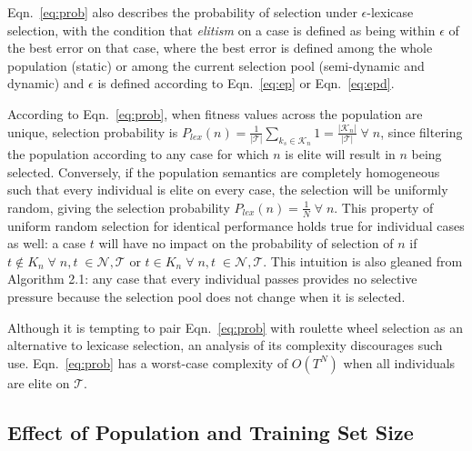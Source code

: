 \documentclass[twoside]{article}
\begin{document}
Eqn.~\ref{eq:prob} also describes the probability of selection under $\epsilon$-lexicase selection, with the condition that {\it elitism} on a case is defined as being within $\epsilon$ of the best error on that case, where the best error is defined among the whole population (static) or among the current selection pool (semi-dynamic and dynamic) and $\epsilon$ is defined according to Eqn.~\ref{eq:ep} or Eqn.~\ref{eq:epd}. 

According to Eqn.~\ref{eq:prob}, when fitness values across the population are unique, selection probability is $P_{lex}(n) = \frac{1}{|\mathcal{T}|} \sum_{k_s \in \mathcal{K}_n} 1 = \frac{|\mathcal{K}_n|}{|\mathcal{T}|} \; \forall \; n$, since filtering the population according to any case for which $n$ is elite will result in $n$ being selected. Conversely, if the population semantics are completely homogeneous such that every individual is elite on every case, the selection will be uniformly random, giving the selection probability $P_{lex}(n) = \frac{1}{N} \; \forall \; n$. This property of uniform random selection for identical performance holds true for individual cases as well: a case $t$ will have no impact on the probability of selection of $n$ if $t \notin K_n \; \forall \; n,t \; \in \mathcal{N}, \mathcal{T}$ or $t \in K_n \; \forall \; n,t \; \in \mathcal{N}, \mathcal{T}$. This intuition is also gleaned from Algorithm 2.1: any case that every individual passes provides no selective pressure because the selection pool does not change when it is selected.

Although it is tempting to pair Eqn.~\ref{eq:prob} with roulette wheel selection as an alternative to lexicase selection, an analysis of its complexity discourages such use. Eqn.~\ref{eq:prob} has a worst-case complexity of $O(T^N)$ when all individuals are elite on $\mathcal{T}$. 

 
\subsection{Effect of Population and Training Set Size}
\end{document}
